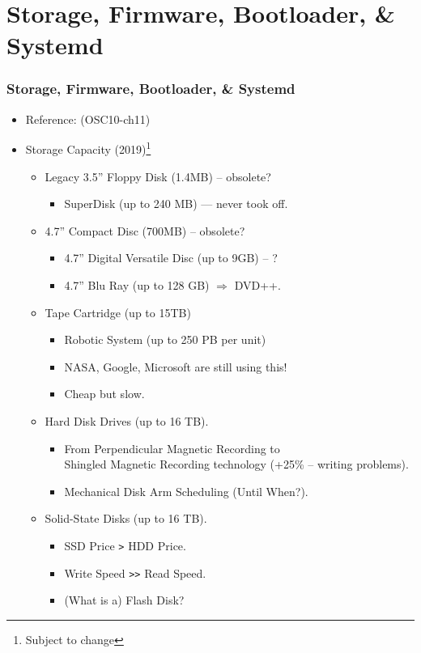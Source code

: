 \documentclass[aspectratio=169, xcolor=table, notheorems, hyperref={pdfpagelabels=false}]{beamer}
\begin{document}
\section{Storage, Firmware, Bootloader, \& Systemd}
\begin{frame}
\frametitle{Storage, Firmware, Bootloader, \& Systemd}
\begin{itemize}
\item Reference: (OSC10-ch11)
\item Storage Capacity (2019)\footnote{Subject to change}
\begin{itemize}
\item Legacy 3.5'' Floppy Disk (1.4MB) -- obsolete?
\begin{itemize}
\item SuperDisk (up to 240 MB) --- never took off.
\end{itemize}
\item 4.7'' Compact Disc (700MB) -- obsolete?
\begin{itemize}
\item 4.7'' Digital Versatile Disc (up to 9GB) -- ?
\item 4.7'' Blu Ray (up to 128 GB) $\Rightarrow$ DVD++.
\end{itemize}
\item Tape Cartridge (up to 15TB)
\begin{itemize}
\item Robotic System (up to 250 PB per unit)
\item NASA, Google, Microsoft are still using this!
\item Cheap but slow.
\end{itemize}
\item Hard Disk Drives (up to 16 TB).
\begin{itemize}
\item From Perpendicular Magnetic Recording to \\
      Shingled Magnetic Recording technology (+25\% -- writing problems).
\item Mechanical Disk Arm Scheduling (Until When?).
\end{itemize}
\item Solid-State Disks (up to 16 TB).
\begin{itemize}
\item SSD Price \texttt{>} HDD Price.
\item Write Speed \texttt{>{}>} Read Speed.
\item (What is a) Flash Disk?
\end{itemize}
\end{itemize}
\end{itemize}
\end{frame}
\end{document}
